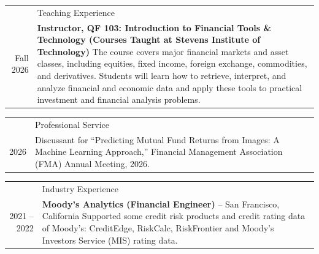 \documentclass[letterpaper, 11pt]{article}
\newcommand{\headingfont}{\Large\color{OliveGreen}}
\newenvironment{SectionTable}[1]{
	\renewcommand*{\arraystretch}{1.55}
	\setlength{\tabcolsep}{10pt}
	\begin{longtable}{Rp{5.45in}} & #1 \\}
{\end{longtable}\vspace{-.3cm}}
\newenvironment{SectionTableSingleSpace}[1]{
	\renewcommand*{\arraystretch}{1.15}
	\setlength{\tabcolsep}{10pt}
	\begin{longtable}{Rp{5.45in}} & #1 \\[0.6em]}
{\end{longtable}\vspace{-.3cm}}
\begin{document}


\begin{SectionTable}{\headingfont Teaching Experience}
Fall 2026 & 
\textbf{Instructor, QF 103: Introduction to Financial Tools \& Technology (Courses Taught at Stevens Institute of Technology)} \newline
The course covers major financial markets and asset classes, including equities, fixed income, foreign exchange, commodities, and derivatives. Students will learn how to retrieve, interpret, and analyze financial and economic data and apply these tools to practical investment and financial analysis problems.

\end{SectionTable}


\begin{SectionTableSingleSpace}{\headingfont Professional Service}
2026 &
Discussant for ``Predicting Mutual Fund Returns from Images: A Machine Learning Approach,'' Financial Management Association (FMA) Annual Meeting, 2026.
\end{SectionTableSingleSpace}


\newpage
\begin{SectionTable}{\headingfont Industry Experience}
2021 -- 2022 &
\textbf{Moody's Analytics (Financial Engineer)} -- San Francisco, California \newline
Supported some credit risk products and credit rating data of Moody's: CreditEdge, RiskCalc, RiskFrontier and Moody's Investors Service (MIS) rating data.  \\

\end{SectionTable}
\end{document}
